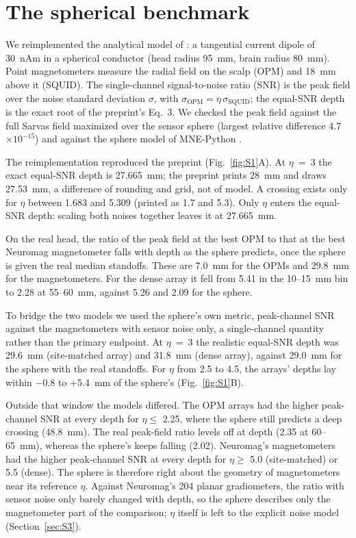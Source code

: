 \documentclass[preprint,12pt,authoryear,a4paper]{elsarticle}
\begin{document}
\section{The spherical benchmark}\label{sec:S2}

We reimplemented the analytical model of \citet{jas2026}: a tangential current dipole of 30~nAm in a spherical conductor (head radius 95~mm, brain radius 80~mm). Point magnetometers measure the radial field on the scalp (OPM) and 18~mm above it (SQUID). The single-channel signal-to-noise ratio (SNR) is the peak field over the noise standard deviation $\sigma$, with $\sigma_{\mathrm{OPM}} = \eta\,\sigma_{\mathrm{SQUID}}$; the equal-SNR depth is the exact root of the preprint's Eq.~3. We checked the peak field against the full Sarvas field maximized over the sensor sphere (largest relative difference 4.7 $\times 10^{-15}$) and against the sphere model of MNE-Python \citep[5.4 $\times 10^{-8}$;][]{gramfort2013}.

The reimplementation reproduced the preprint (Fig.~\ref{fig:S1}A). At $\eta$~=~3 the exact equal-SNR depth is 27.665~mm; the preprint prints 28~mm and draws 27.53~mm, a difference of rounding and grid, not of model. A crossing exists only for $\eta$ between 1.683 and 5.309 (printed as 1.7 and 5.3). Only $\eta$ enters the equal-SNR depth: scaling both noises together leaves it at 27.665~mm.

On the real head, the ratio of the peak field at the best OPM to that at the best Neuromag magnetometer falls with depth as the sphere predicts, once the sphere is given the real median standoffs. These are 7.0~mm for the OPMs and 29.8~mm for the magnetometers. For the dense array it fell from 5.41 in the 10–15~mm bin to 2.28 at 55–60~mm, against 5.26 and 2.09 for the sphere.

To bridge the two models we used the sphere's own metric, peak-channel SNR against the magnetometers with sensor noise only, a single-channel quantity rather than the primary endpoint. At $\eta$~=~3 the realistic equal-SNR depth was 29.6~mm (site-matched array) and 31.8~mm (dense array), against 29.0~mm for the sphere with the real standoffs. For $\eta$ from 2.5 to 4.5, the arrays' depths lay within −0.8 to +5.4~mm of the sphere's (Fig.~\ref{fig:S1}B).

Outside that window the models differed. The OPM arrays had the higher peak-channel SNR at every depth for $\eta \le$ 2.25, where the sphere still predicts a deep crossing (48.8~mm). The real peak-field ratio levels off at depth (2.35 at 60–65~mm), whereas the sphere's keeps falling (2.02). Neuromag's magnetometers had the higher peak-channel SNR at every depth for $\eta \ge$ 5.0 (site-matched) or 5.5 (dense). The sphere is therefore right about the geometry of magnetometers near its reference $\eta$. Against Neuromag's 204 planar gradiometers, the ratio with sensor noise only barely changed with depth, so the sphere describes only the magnetometer part of the comparison; $\eta$ itself is left to the explicit noise model (Section~\ref{sec:S3}).
\end{document}
